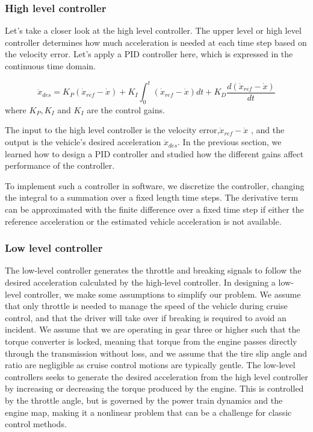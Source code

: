 \subsubsection{High level controller}
\label{high_level_controller}

Let's take a closer look at the high level controller. The upper level or high level controller determines how much acceleration is needed at each time step based on the velocity error. Let's apply a PID controller here, which is expressed in the continuous time domain. 

\begin{equation}
\ddot{x}_{des} = K_P(\dot{x}_{ref}-\dot{x}) + K_I\int_{0}^{t}(\dot{x}_{ref}-\dot{x})dt + K_D\frac{d(\dot{x}_{ref}-\dot{x})}{dt}
\end{equation}
where $K_P, K_I$ and $K_I$ are the control gains.

The input to the high level controller is the velocity error,$\dot{x}_{ref}-\dot{x}$ , and the output is the vehicle's desired acceleration $\ddot{x}_{des}$. In the previous section, we learned how to design a PID controller and studied how the different gains affect performance of the controller. 

To implement such a controller in software, we discretize the controller, changing the integral to a summation over a fixed length time steps. The derivative term can be approximated with the finite difference over a fixed time step if either the reference acceleration or the estimated vehicle acceleration is not available. 

\subsubsection{Low level controller}

The low-level controller generates the throttle and breaking signals to follow the desired acceleration calculated by the high-level controller. In designing a low-level controller, we make some assumptions to simplify our problem. We assume that only throttle is needed to manage the speed of the vehicle during cruise control, and that the driver will take over if breaking is required to avoid an incident. We assume that we are operating in gear three or higher such that the torque converter is locked, meaning that torque from the engine passes directly through the transmission without loss, and we assume that the tire slip angle and ratio are negligible as cruise control motions are typically gentle. The low-level controllers seeks to generate the desired acceleration from the high level controller by increasing or decreasing the torque produced by the engine. This is controlled by the throttle angle, but is governed by the power train dynamics and the engine map, making it a nonlinear problem that can be a challenge for classic control methods. 

